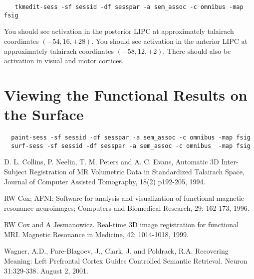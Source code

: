 \documentclass[12pt]{article}
\begin{document}
\begin{verbatim}
   tkmedit-sess -sf sessid -df sesspar -a sem_assoc -c omnibus -map fsig
\end{verbatim}

You should see activation in the posterior LIPC at approximately
talairach coordinates $(-54, 16, +28)$.  You should see activation in
the anterior LIPC at approximately talairach coordinates $(-58, 12,
+2)$. There should also be activation in visual and motor cortices.\\

\section{Viewing the Functional Results on the Surface}

\begin{verbatim}
  paint-sess -sf sessid -df sesspar -a sem_assoc -c omnibus -map fsig
  surf-sess -sf sessid -df sesspar -a sem_assoc -c omnibus  -map fsig
\end{verbatim}


\begin{thebibliography}{99}

D. L.  Collins, P.  Neelin, T.  M.  Peters and A.
C.  Evans, Automatic 3D Inter-Subject Registration of MR Volumetric
Data in Standardized Talairach Space, Journal of Computer Assisted
Tomography, 18(2) p192-205, 1994.

RW Cox; AFNI: Software for analysis and visualization of functional
magnetic resonance neuroimages; Computers and Biomedical Research, 29:
162-173, 1996.

 RW Cox and A Jesmanowicz.
Real-time 3D image registration for functional MRI.  Magnetic
Resonance in Medicine, 42: 1014-1018, 1999.

 Wagner, A.D., Pare-Blagoev, J.,
Clark, J. and Poldrack, R.A. Recovering Meaning: Left
Prefrontal Cortex Guides Controlled Semantic Retrieval. Neuron
31:329-338. August 2, 2001.

\end{thebibliography}
\end{document}
